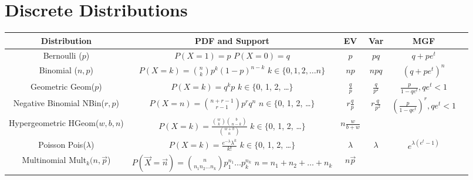 \documentclass[11pt]{article}
\theoremstyle{definition}
\theoremstyle{remark}
\newcommand{\Bin}{\text{Bin}}
\newcommand{\Bern}{\text{Bern}}
\newcommand{\NBin}{\textnormal{NBin}}
\newcommand{\Geom}{\textnormal{Geom}}
\newcommand{\HGeom}{\textnormal{HGeom}}
\newcommand{\Mult}{\textnormal{Mult}}
\newcommand{\Pois}{\textnormal{Pois}}
\begin{document}
\section*{Discrete Distributions}
\begin{center}
\renewcommand{\arraystretch}{3}
\begin{tabular}{cccccc}
\textbf{Distribution} & \textbf{PDF and Support} & \textbf{EV}  & \textbf{Var} & \textbf{MGF}\\
\hline
\shortstack{Bernoulli \\ \Bern($p$)} & \shortstack{$P(X=1) = p$ \\$ P(X=0) = q$} & $p$ & $pq$ & $q + pe^t$ \\
\hline
\shortstack{Binomial \\ \Bin($n, p$)} & \shortstack{$P(X=k) = {n \choose k}p^k(1-p)^{n-k}$  \\ $k \in \{0, 1, 2, \dots n\}$}& $np$ & $npq$ & $(q + pe^t)^n$ \\
\hline
\shortstack{Geometric \\ \Geom($p$)} & \shortstack{$P(X=k) = q^kp$  \\ $k \in \{$0, 1, 2, \dots $\}$}& $\frac{q}{p}$ & $\frac{q}{p^2}$ & $\frac{p}{1-qe^t}, qe^t < 1$\\
\hline
\shortstack{Negative Binomial \\ \NBin($r, p$)} & \shortstack{$P(X=n) = {n+r - 1 \choose r -1}p^rq^n$ \\ $n \in \{$0, 1, 2, \dots $\}$} & $r\frac{q}{p}$ & $r\frac{q}{p^2}$ &  $(\frac{p}{1-qe^t})^r, qe^t < 1$\\
\hline
\shortstack{Hypergeometric \\ \HGeom($w, b, n$)} & \shortstack{$P(X=k) = \frac{{w \choose k}{b \choose n-k}}{{w + b \choose n}}$ \\ $k \in \{$0, 1, 2, \dots $\}$} & $n\frac{w}{b+w}$ & &   \\
\hline
\shortstack{Poisson \\ \Pois($\lambda$)} & \shortstack{$P(X=k) = \frac{e^{-\lambda}\lambda^k}{k!}$ \\ $k \in \{$0, 1, 2, \dots $\}$} & $\lambda$ & $\lambda$ & $e^{\lambda(e^t-1)}$ \\
\hline
\shortstack{Multinomial \\ \Mult$_k(n, \vec{p}$)} & \shortstack{$P(\vec{X} = \vec{n}) = {n \choose n_1n_2\dots n_k}p_1^{n_1}\dots p_k^{n_k}$ \\ $n = n_1 + n_2 + \dots + n_k$} & $n\vec{p}$ & &  \\

\end{tabular}
\end{center}
\end{document}
